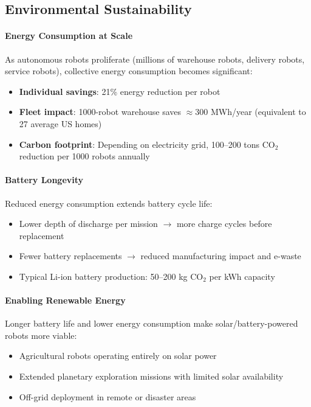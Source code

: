 \subsection{Environmental Sustainability}

\paragraph{Energy Consumption at Scale}
As autonomous robots proliferate (millions of warehouse robots, delivery robots, service robots), collective energy consumption becomes significant:
\begin{itemize}
    \item \textbf{Individual savings}: 21\% energy reduction per robot
    \item \textbf{Fleet impact}: 1000-robot warehouse saves $\approx$300 MWh/year (equivalent to 27 average US homes)
    \item \textbf{Carbon footprint}: Depending on electricity grid, 100--200 tons CO$_2$ reduction per 1000 robots annually
\end{itemize}

\paragraph{Battery Longevity}
Reduced energy consumption extends battery cycle life:
\begin{itemize}
    \item Lower depth of discharge per mission $\rightarrow$ more charge cycles before replacement
    \item Fewer battery replacements $\rightarrow$ reduced manufacturing impact and e-waste
    \item Typical Li-ion battery production: 50--200 kg CO$_2$ per kWh capacity
\end{itemize}

\paragraph{Enabling Renewable Energy}
Longer battery life and lower energy consumption make solar/battery-powered robots more viable:
\begin{itemize}
    \item Agricultural robots operating entirely on solar power
    \item Extended planetary exploration missions with limited solar availability
    \item Off-grid deployment in remote or disaster areas
\end{itemize}


